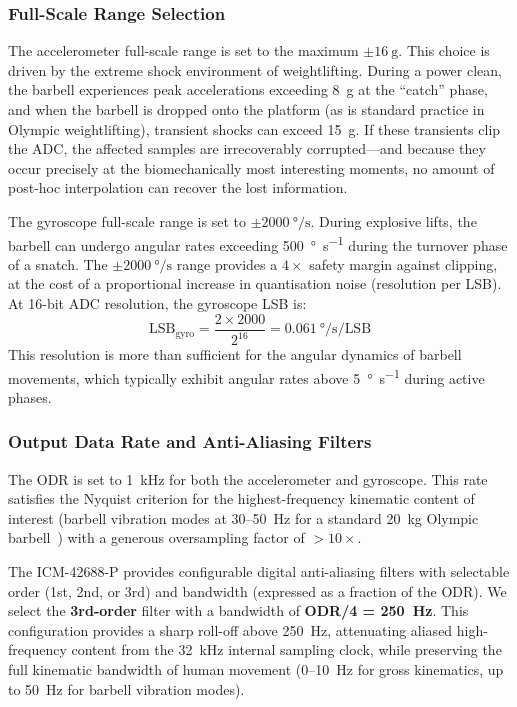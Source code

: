\subsubsection{Full-Scale Range Selection}

The accelerometer full-scale range is set to the maximum $\pm\SI{16}{\g}$.
This choice is driven by the extreme shock environment of weightlifting.
During a power clean, the barbell experiences peak accelerations exceeding \SI{8}{\g} at the ``catch'' phase, and when the barbell is dropped onto the platform (as is standard practice in Olympic weightlifting), transient shocks can exceed \SI{15}{\g}.
If these transients clip the ADC, the affected samples are irrecoverably corrupted---and because they occur precisely at the biomechanically most interesting moments, no amount of post-hoc interpolation can recover the lost information.

The gyroscope full-scale range is set to $\pm\SI{2000}{\degree\per\second}$.
During explosive lifts, the barbell can undergo angular rates exceeding \SI{500}{\degree\per\second} during the turnover phase of a snatch.
The $\pm\SI{2000}{\degree\per\second}$ range provides a $4\times$ safety margin against clipping, at the cost of a proportional increase in quantisation noise (resolution per LSB).
At 16-bit ADC resolution, the gyroscope LSB is:
\begin{equation}
  \text{LSB}_\text{gyro} = \frac{2 \times 2000}{2^{16}} = \SI{0.061}{\degree\per\second\per\text{LSB}}
\end{equation}
This resolution is more than sufficient for the angular dynamics of barbell movements, which typically exhibit angular rates above \SI{5}{\degree\per\second} during active phases.

\subsubsection{Output Data Rate and Anti-Aliasing Filters}

The ODR is set to \SI{1}{\kilo\hertz} for both the accelerometer and gyroscope.
This rate satisfies the Nyquist criterion for the highest-frequency kinematic content of interest (barbell vibration modes at \SI{30}{}--\SI{50}{\hertz} for a standard \SI{20}{\kilogram} Olympic barbell~\cite{mcguigan2004}) with a generous oversampling factor of $>10\times$.

The ICM-42688-P provides configurable digital anti-aliasing filters with selectable order (1st, 2nd, or 3rd) and bandwidth (expressed as a fraction of the ODR).
We select the \textbf{3rd-order} filter with a bandwidth of \textbf{ODR/4 = \SI{250}{\hertz}}.
This configuration provides a sharp roll-off above \SI{250}{\hertz}, attenuating aliased high-frequency content from the \SI{32}{\kilo\hertz} internal sampling clock, while preserving the full kinematic bandwidth of human movement ($0$--\SI{10}{\hertz} for gross kinematics, up to \SI{50}{\hertz} for barbell vibration modes).

